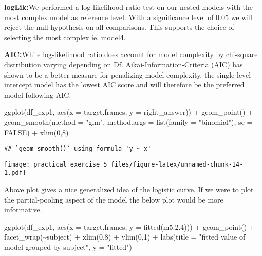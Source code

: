 \documentclass[
]{article}
\newenvironment{Shaded}{\begin{snugshade}}{\end{snugshade}}
\newcommand{\AttributeTok}[1]{\textcolor[rgb]{0.77,0.63,0.00}{#1}}
\newcommand{\ConstantTok}[1]{\textcolor[rgb]{0.00,0.00,0.00}{#1}}
\newcommand{\DecValTok}[1]{\textcolor[rgb]{0.00,0.00,0.81}{#1}}
\newcommand{\FloatTok}[1]{\textcolor[rgb]{0.00,0.00,0.81}{#1}}
\newcommand{\FunctionTok}[1]{\textcolor[rgb]{0.00,0.00,0.00}{#1}}
\newcommand{\NormalTok}[1]{#1}
\newcommand{\SpecialCharTok}[1]{\textcolor[rgb]{0.00,0.00,0.00}{#1}}
\newcommand{\StringTok}[1]{\textcolor[rgb]{0.31,0.60,0.02}{#1}}
\begin{document}
\textbf{logLik:}We performed a log-likelihood ratio test on our nested
models with the most complex model as reference level. With a
significance level of 0.05 we will reject the null-hypothesis on all
comparisons. This supports the choice of selecting the most complex ie.
model4.

\textbf{AIC:}While log-likelihood ratio does account for model
complexity by chi-square distribution varying depending on Df.
Aikai-Information-Criteria (AIC) has shown to be a better measure for
penalizing model complexity. the single level intercept model has the
lowest AIC score and will therefore be the preferred model following
AIC.

\begin{Shaded}
\begin{Highlighting}[]
\FunctionTok{ggplot}\NormalTok{(df\_exp1, }\FunctionTok{aes}\NormalTok{(}\AttributeTok{x =}\NormalTok{ target.frames, }\AttributeTok{y =}\NormalTok{ right\_answer)) }\SpecialCharTok{+} \FunctionTok{geom\_point}\NormalTok{() }\SpecialCharTok{+}   \FunctionTok{geom\_smooth}\NormalTok{(}\AttributeTok{method =} \StringTok{"glm"}\NormalTok{, }
    \AttributeTok{method.args =} \FunctionTok{list}\NormalTok{(}\AttributeTok{family =} \StringTok{"binomial"}\NormalTok{), }
    \AttributeTok{se =} \ConstantTok{FALSE}\NormalTok{) }\SpecialCharTok{+} \FunctionTok{xlim}\NormalTok{(}\DecValTok{0}\NormalTok{,}\DecValTok{8}\NormalTok{)}
\end{Highlighting}
\end{Shaded}

\begin{verbatim}
## `geom_smooth()` using formula 'y ~ x'
\end{verbatim}

\texttt{[image: practical\_exercise\_5\_files/figure-latex/unnamed-chunk-14-1.pdf]}

Above plot gives a nice generalized idea of the logistic curve. If we
were to plot the partial-pooling aspect of the model the below plot
would be more informative.

\begin{Shaded}
\begin{Highlighting}[]
\FunctionTok{ggplot}\NormalTok{(df\_exp1, }\FunctionTok{aes}\NormalTok{(}\AttributeTok{x =}\NormalTok{ target.frames, }\AttributeTok{y =} \FunctionTok{fitted}\NormalTok{(m5.}\FloatTok{2.4}\NormalTok{))) }\SpecialCharTok{+} \FunctionTok{geom\_point}\NormalTok{() }\SpecialCharTok{+} \FunctionTok{facet\_wrap}\NormalTok{(}\SpecialCharTok{\textasciitilde{}}\NormalTok{subject) }\SpecialCharTok{+} \FunctionTok{xlim}\NormalTok{(}\DecValTok{0}\NormalTok{,}\DecValTok{8}\NormalTok{) }\SpecialCharTok{+} \FunctionTok{ylim}\NormalTok{(}\DecValTok{0}\NormalTok{,}\DecValTok{1}\NormalTok{) }\SpecialCharTok{+} \FunctionTok{labs}\NormalTok{(}\AttributeTok{title =} \StringTok{"fitted value of model grouped by subject"}\NormalTok{, }\AttributeTok{y =} \StringTok{"fitted"}\NormalTok{)}
\end{Highlighting}
\end{Shaded}
\end{document}
